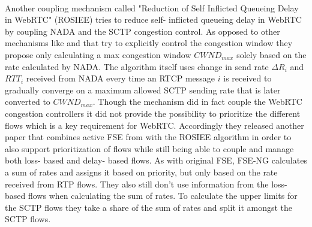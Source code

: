 \paragraph{}
Another coupling mechanism called "Reduction of Self Inflicted Queueing Delay in WebRTC" (ROSIEE) \cite{8065803} tries to reduce self- inflicted queueing delay in WebRTC by coupling NADA and the SCTP congestion control. 
As opposed to other mechanisms like \cite{rfc8699} and \cite{rfc3124} that try to explicitly control the congestion window they propose only calculating a max congestion window ${CWND_{max}}$ solely based on the rate calculated by NADA. 
The algorithm itself uses change in send rate $\Delta{R_i}$ and ${RTT_i}$ received from NADA every time an RTCP message $i$ is received to gradually converge on a maximum allowed SCTP sending rate that is later converted to ${CWND_{max}}$.
Though the mechanism did in fact couple the WebRTC congestion controllers it did not provide the possibility to prioritize the different flows which is a key requirement for WebRTC.
Accordingly they released another paper \cite{8638084} that combines active FSE from \cite{rfc8699} with the ROSIEE algorithm in order to also support prioritization of flows while still being able to couple and manage both loss- based and delay- based flows.
As with original FSE, FSE-NG calculates a sum of rates and assigns it based on priority, but only based on the rate received from RTP flows.
They also still don't use information from the loss- based flows when calculating the sum of rates.
To calculate the upper limits for the SCTP flows they take a share of the sum of rates and split it amongst the SCTP flows.
